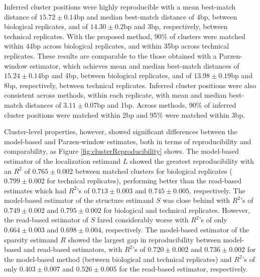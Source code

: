 Inferred cluster positions were highly reproducible with a mean best-match distance of $15.72\pm0.14$bp and median best-match distance of 4bp, between biological replicates, and of $14.30\pm0.2$bp and 3bp, respectively, between technical replicates.
With the proposed method, 90\% of clusters were matched within 44bp across biological replicates, and within 35bp across technical replicates.
These results are comparable to the those obtained with a Parzen-window estimator, which achieves mean and median best-match distances of $15.24\pm0.14$bp and 4bp, between biological replicates, and of $13.98\pm0.19$bp and 8bp, respectively, between technical replicates.
Inferred cluster positions were also consistent across methods, within each replicate, with mean and median best-match distances of $3.11\pm0.07$bp and 1bp.
Across methods, 90\% of inferred cluster positions were matched within 2bp and 95\% were matched within 3bp.

Cluster-level properties, however, showed significant differences between the model-based and Parzen-window estimates, both in terms of reproducibility and comparability, as Figure \ref{fig:clusterReproducibility} shows.
%
The model-based estimator of the localization estimand $L$
 showed the greatest reproducibility with an $R^2$ of $0.765\pm0.002$ between matched clusters for biological replicates ($0.799\pm0.002$ for technical replicates), performing  better than the read-based estimates which had $R^2$'s of $0.713\pm0.003$ and $0.745\pm0.005$, respectively.
%
The model-based estimator of the structure estimand $S$
 was close behind with $R^2$'s of $0.749\pm0.002$ and $0.795\pm0.002$ for biological and technical replicates.
However, the read-based estimator of $S$ fared considerably worse with $R^2$'s of only $0.664\pm0.003$ and $0.698\pm0.004$, respectively.
%
The model-based estimator of the sparsity estimand $R$ showed the largest gap in reproducibility between model-based and read-based estimators, with $R^2$'s of $0.720\pm0.002$ and $0.736\pm0.002$ for the model-based method (between biological and technical replicates) and $R^2$'s of only $0.403\pm0.007$ and $0.526\pm0.005$ for the read-based estimator, respectively.

